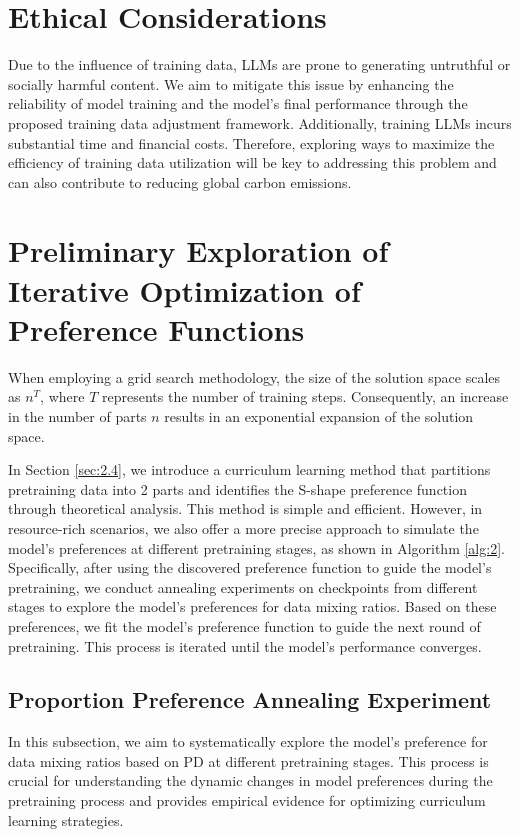 \documentclass[11pt]{article}
\begin{document}
%


\appendix

\section{Ethical Considerations}
Due to the influence of training data, LLMs are prone to generating untruthful or socially harmful content. We aim to mitigate this issue by enhancing the reliability of model training and the model’s final performance through the proposed training data adjustment framework. Additionally, training LLMs incurs substantial time and financial costs. Therefore, exploring ways to maximize the efficiency of training data utilization will be key to addressing this problem and can also contribute to reducing global carbon emissions.

\section{Preliminary Exploration of Iterative Optimization of Preference Functions}
\label{sec:apc}
When employing a grid search methodology, the size of the solution space scales as \( n^T \), where \( T \) represents the number of training steps. Consequently, an increase in the number of parts \( n \) results in an exponential expansion of the solution space.

In Section \ref{sec:2.4}, we introduce a curriculum learning method that partitions pretraining data into 2 parts and identifies the S-shape preference function through theoretical analysis. This method is simple and efficient. However, in resource-rich scenarios, we also offer a more precise approach to simulate the model's preferences at different pretraining stages, as shown in Algorithm \ref{alg:2}. Specifically, after using the discovered preference function to guide the model's pretraining, we conduct annealing experiments on checkpoints from different stages to explore the model's preferences for data mixing ratios. Based on these preferences, we fit the model's preference function to guide the next round of pretraining. This process is iterated until the model's performance converges.

\subsection{Proportion Preference Annealing Experiment}
In this subsection, we aim to systematically explore the model's preference for data mixing ratios based on PD at different pretraining stages. This process is crucial for understanding the dynamic changes in model preferences during the pretraining process and provides empirical evidence for optimizing curriculum learning strategies.
\end{document}
